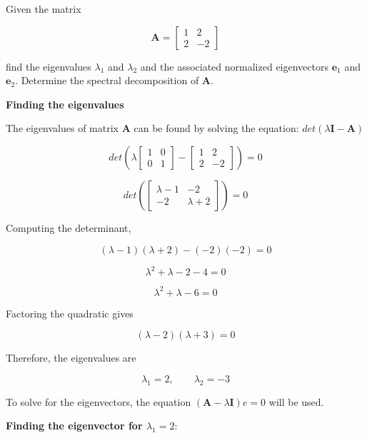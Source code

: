\documentclass[12pt]{article}
\begin{document}
\vspace{1em}

\noindent Given the matrix

$$
\mathbf{A} = \begin{bmatrix} 1 & 2 \\ 2 & -2 \end{bmatrix}
$$

\noindent find the eigenvalues $\lambda_1$ and $\lambda_2$ and the associated normalized eigenvectors $\mathbf{e}_1$ and $\mathbf{e}_2$. Determine the spectral decomposition of $\mathbf{A}$.

\vspace{1em}

\noindent \textbf{Finding the eigenvalues}

\noindent The eigenvalues of matrix $\mathbf{A}$ can be found by solving the equation: $det( \lambda \mathbf{I}-\mathbf{A})$

$$
det\left(
\lambda\begin{bmatrix} 1 & 0 \\ 0 & 1 \end{bmatrix} - \begin{bmatrix} 1 & 2 \\ 2 & -2 \end{bmatrix}
\right) = 0
$$

$$
det\left(
\begin{bmatrix} \lambda -1 & -2 \\ -2 & \lambda + 2 \end{bmatrix}
\right) = 0
$$

\noindent Computing the determinant, 

$$
(\lambda-1)(\lambda+2)-(-2)(-2)=0
$$

$$
\lambda^2+\lambda-2-4=0
$$

$$
\lambda^2+\lambda-6=0
$$

\noindent Factoring the quadratic gives

$$
(\lambda-2)(\lambda+3)=0
$$

\noindent Therefore, the eigenvalues are

$$
\boxed{\lambda_1=2,\qquad \lambda_2=-3}
$$

\vspace{1em}

\noindent To solve for the eigenvectors, the equation $(\mathbf{A}-\lambda\mathbf{I})e = 0$ will be used.

\vspace{1em}

\noindent \textbf{Finding the eigenvector for $\lambda_1 = 2$}:
\end{document}
